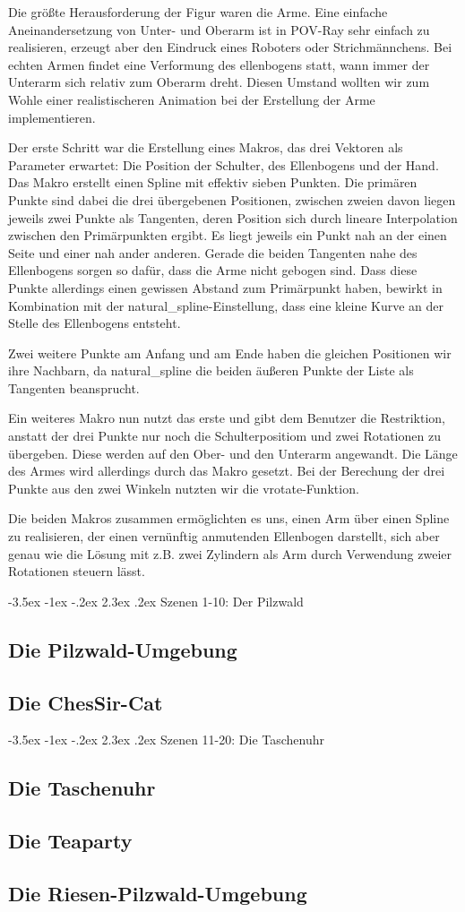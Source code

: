 \documentclass[twocolumn]{article}
\makeatletter
\renewcommand\section{\@startsection{section}{1}{\z@}%
                                      {-3.5ex \@plus -1ex \@minus -.2ex}%
                                      {2.3ex \@plus.2ex}%
                                      {\normalfont\large\bfseries}}
\makeatother
\begin{document}
Die größte Herausforderung der Figur waren die Arme.
Eine einfache Aneinandersetzung von Unter- und Oberarm ist in POV-Ray sehr einfach zu realisieren, erzeugt aber den Eindruck eines Roboters oder Strichmännchens.
Bei echten Armen findet eine Verformung des ellenbogens statt, wann immer der Unterarm sich relativ zum Oberarm dreht.
Diesen Umstand wollten wir zum Wohle einer realistischeren Animation bei der Erstellung der Arme implementieren.

Der erste Schritt war die Erstellung eines Makros, das drei Vektoren als Parameter erwartet: Die Position der Schulter, des Ellenbogens und der Hand.
Das Makro erstellt einen Spline mit effektiv sieben Punkten.
Die primären Punkte sind dabei die drei übergebenen Positionen, zwischen zweien davon liegen jeweils zwei Punkte als Tangenten, deren Position sich durch lineare Interpolation zwischen den Primärpunkten ergibt. Es liegt jeweils ein Punkt nah an der einen Seite und einer nah ander anderen.
Gerade die beiden Tangenten nahe des Ellenbogens sorgen so dafür, dass die Arme nicht gebogen sind. Dass diese Punkte allerdings einen gewissen Abstand zum Primärpunkt haben, bewirkt in Kombination mit der natural\_spline-Einstellung, dass eine kleine Kurve an der Stelle des Ellenbogens entsteht.

Zwei weitere Punkte am Anfang und am Ende haben die gleichen Positionen wir ihre Nachbarn, da natural\_spline die beiden äußeren Punkte der Liste als Tangenten beansprucht. %

Ein weiteres Makro nun nutzt das erste und gibt dem Benutzer die Restriktion, anstatt der drei Punkte nur noch die Schulterpositiom und zwei Rotationen zu übergeben.
Diese werden auf den Ober- und den Unterarm angewandt. Die Länge des Armes wird allerdings durch das Makro gesetzt.
Bei der Berechung der drei Punkte aus den zwei Winkeln nutzten wir die vrotate-Funktion.

Die beiden Makros zusammen ermöglichten es uns, einen Arm über einen Spline zu realisieren, der einen vernünftig anmutenden Ellenbogen darstellt, sich aber genau wie die Lösung mit z.B. zwei Zylindern als Arm durch Verwendung zweier Rotationen steuern lässt.

\section{Szenen 1-10: Der Pilzwald}
\subsection{Die Pilzwald-Umgebung}
\subsection{Die ChesSir-Cat}

\section{Szenen 11-20: Die Taschenuhr}
\subsection{Die Taschenuhr}
\subsection{Die Teaparty}
\subsection{Die Riesen-Pilzwald-Umgebung}
\end{document}
